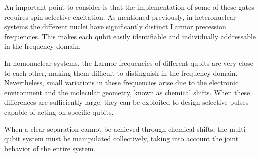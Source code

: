 An important point to consider is that the implementation of some of these gates requires spin-selective excitation. As mentioned previously, in heteronuclear systems the different nuclei have significantly distinct Larmor precession frequencies. This makes each qubit easily identifiable and individually addressable in the frequency domain.

In homonuclear systems, the Larmor frequencies of different qubits are very close to each other, making them difficult to distinguish in the frequency domain. Nevertheless, small variations in these frequencies arise due to the electronic environment and the molecular geometry, known as chemical shifts. When these differences are sufficiently large, they can be exploited to design selective pulses capable of acting on specific qubits.

When a clear separation cannot be achieved through chemical shifts, the multi-qubit system must be manipulated collectively, taking into account the joint behavior of the entire system.

